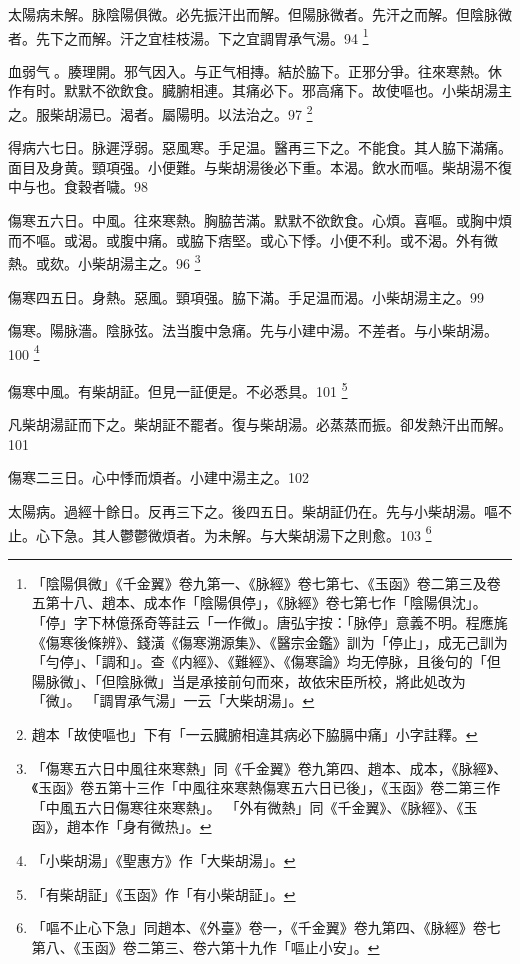 太陽病未解。脉陰陽俱微。必先振汗出而解。但陽{\khaai 脉}微者。先汗之而解。但陰{\khaai 脉}微者。先下之而解。汗之宜桂枝湯。下之宜{\khaai 調胃}承气湯。94
	\footnote{
		「陰陽俱微」《千金翼》卷九第一、《脉經》卷七第七、《玉函》卷二第三及卷五第十八、趙本、成本作「陰陽俱停」，《脉經》卷七第七作「陰陽俱沈」。
		「停」字下林億孫奇等註云「一作微」。唐弘宇按：「脉停」意義不明。程應旄《傷寒後條辨》、錢潢《傷寒溯源集》、《醫宗金鑑》訓为「停止」，成无己訓为「勻停」、「調和」。查《内經》、《難經》、《傷寒論》均无停脉，且後句的「但陽脉微」、「但陰脉微」当是承接前句而來，故依宋臣所校，將此処改为「微」。
		「調胃承气湯」一云「大柴胡湯」。
	}

血弱气{\sungii 𥁞}。腠理開。邪气因入。与正气相摶。結於脇下。正邪分爭。往來寒熱。休作有时。默默不欲飲食。臓腑相連。其痛必下。邪高痛下。故使嘔也。小柴胡湯主之。服柴胡湯已。渴者。屬陽明。以法治之。97
	\footnote{
		趙本「故使嘔也」下有「一云臓腑相違其病必下脇膈中痛」小字註釋。
	}

得病六七日。脉遲浮弱。惡風寒。手足温。醫再三下之。不能食。其人脇下滿{\khaai 痛}。面目及身黄。頸項强。小便難。与柴胡湯後必下重。本渴。飲水而嘔。柴胡{\khaai 湯}不復中与也。食穀者噦。98

傷寒五六日。中風。往來寒熱。胸脇苦滿。默默不欲飲食。心煩。喜嘔。或胸中煩而不嘔。或渴。或腹中痛。或脇下痞堅。或心下悸。小便不利。或不渴。外有微熱。或欬。小柴胡湯主之。96
	\footnote{
		「傷寒五六日中風往來寒熱」同《千金翼》卷九第四、趙本、成本，《脉經》、《玉函》卷五第十三作「中風往來寒熱傷寒五六日已後」，《玉函》卷二第三作「中風五六日傷寒往來寒熱」。
		「外有微熱」同《千金翼》、《脉經》、《玉函》，趙本作「身有微热」。
	}

傷寒四五日。身熱。惡風。頸項强。脇下滿。手足温而渴。小柴胡湯主之。99

傷寒。陽脉濇。陰脉弦。法当腹中急痛。先与小建中湯。不差者。与小柴胡湯。100
	\footnote{
	「小柴胡湯」《聖惠方》作「大柴胡湯」。
	}

傷寒中風。有柴胡証。但見一証便是。不必悉具。101
	\footnote{
	「有柴胡証」《玉函》作「有小柴胡証」。
	}

凡柴胡湯証而下之。柴胡証不罷者。復与柴胡湯。必蒸蒸而振。卻发熱汗出而解。101

傷寒二三日。心中悸而煩者。小建中湯主之。102

太陽病。過經十餘日。反再三下之。後四五日。柴胡証仍在。先与小柴胡湯。嘔不止。心下急。其人鬱鬱微煩者。为未解。与大柴胡湯下之則愈。103
	\footnote{
		「嘔不止心下急」同趙本、《外臺》卷一，《千金翼》卷九第四、《脉經》卷七第八、《玉函》卷二第三、卷六第十九作「嘔止小安」。
	}

